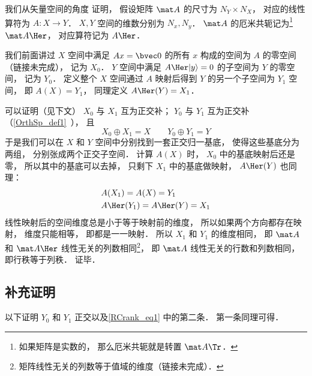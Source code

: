 

我们从矢量空间的角度 证明， 假设矩阵 $\mat A$ 的尺寸为 $N_Y \times N_X$， 对应的线性算符为 $A: X\to Y$． $X, Y$ 空间的维数分别为 $N_x, N_y$． $\mat A$ 的厄米共轭记为\footnote{如果矩阵是实数的， 那么厄米共轭就是转置 $\mat A\Tr$．} $\mat A\Her$， 对应算符记为 $A\Her$．

我们前面讲过 $X$ 空间中满足 $A {x} = \bvec 0$ 的所有 ${x}$ 构成的空间为 $A$ 的零空间（链接未完成）， 记为 $X_0$． $Y$ 空间中满足 $A\Her |y\rangle = 0$ 的子空间为 $Y$ 的零空间， 记为 $Y_0$． 定义整个 $X$ 空间通过 $A$ 映射后得到 $Y$ 的另一个子空间为 $Y_1$ 空间， 即 $A(X) = Y_1$， 同理定义 $A\Her(Y) = X_1$． %

可以证明（见下文） $X_0$ 与 $X_1$ 互为正交补； $Y_0$ 与 $Y_1$ 互为正交补（\autoref{OrthSp_def1}~）， 且
\begin{equation}\label{RCrank_eq1}
X_0 \oplus X_1 = X
\qquad
Y_0 \oplus Y_1 = Y
\end{equation}
于是我们可以在 $X$ 和 $Y$ 空间中分别找到一套正交归一基底， 使得这些基底分为两组， 分别张成两个正交子空间． 计算 $A(X)$ 时， $X_0$ 中的基底映射后还是零， 所以其中的基底可以去掉， 只剩下 $X_1$ 中的基底做映射， $A\Her(Y)$ 也同理：
\begin{equation}
\begin{aligned}
&A(X_1) = A(X) = Y_1\\
&A\Her(Y_1) = A\Her(Y) = X_1
\end{aligned}
\end{equation}
线性映射后的空间维度总是小于等于映射前的维度， 所以如果两个方向都存在映射， 维度只能相等， 即都是一一映射． 所以 $X_1$ 和 $Y_1$ 的维度相同， 即 $\mat A$ 和 $\mat A\Her$ 线性无关的列数相同\footnote{矩阵线性无关的列数等于值域的维度（链接未完成）．}， 即 $\mat A$ 线性无关的行数和列数相同， 即行秩等于列秩． 证毕．

\subsection{补充证明}
以下证明 $Y_0$ 和 $Y_1$ 正交以及\autoref{RCrank_eq1} 中的第二条． 第一条同理可得．

